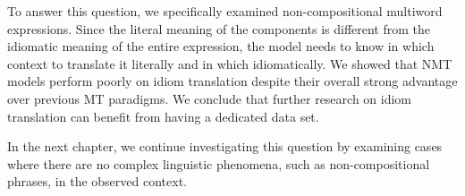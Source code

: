 \medskip

 \noindent To answer this question, we specifically examined non-compositional multiword expressions.
Since the literal meaning of the components is different from the idiomatic meaning of the entire expression, the model needs to know in which context to translate it literally and in which idiomatically. 
We showed that NMT models perform poorly on idiom translation despite their overall strong advantage over previous MT paradigms. 
We conclude that further research on idiom translation can benefit from having a dedicated data set. 

\noindent In the next chapter, we continue investigating this question by examining cases where there are no complex linguistic phenomena, such as non-compositional phrases, in the observed context.









